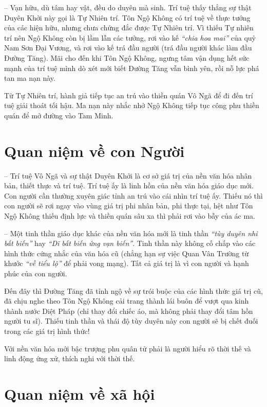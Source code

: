 -- Vạn hữu, dù tâm hay vật, đều do duyên mà sinh. Trí tuệ thấy thẳng sự thật Duyên Khởi này gọi là Tự Nhiên trí. Tôn Ngộ Không có trí tuệ về thực tướng của các hiện hữu, nhưng chưa chứng đắc được Tự Nhiên trí. Vì thiếu Tự nhiên trí nên Ngộ Không còn bị lầm lẫn các tưởng, rơi vào kế \emph{``chia hoa mai''} của quỷ Nam Sơn Đại Vương, và rơi vào kế trá đầu người (trá đầu người khác làm đầu Đường Tăng). Mãi cho đến khi Tôn Ngộ Không, ngưng tâm vận dụng hết sức mạnh của trí tuệ mình dò xét mới biết Đường Tăng vẫn bình yên, rồi nỗ lực phá tan ma nạn này.

Từ Tự Nhiên trí, hành giả tiếp tục an trú vào thiền quán Vô Ngã để đi đến trí tuệ giải thoát tối hậu. Ma nạn này nhắc nhở Ngộ Không tiếp tục công phu thiền quán để mở đường vào Tam Minh.

\section{Quan niệm về con Người} %
\label{sec:84_85_con_nguoi}

-- Trí tuệ Vô Ngã và sự thật Duyên Khởi là cơ sở giá trị của nền văn hóa nhân bản, thiết thực và trí tuệ. Trí tuệ ấy là linh hồn của nền văn hóa giáo dục mới. Con người cần thường xuyên giác tỉnh an trú vào cái nhìn trí tuệ ấy. Thiếu nó thì con người sẽ rơi ngay vào vùng giá trị phi nhân bản, phi thực tại, hệt như Tôn Ngộ Không thiếu định lực và thiền quán sâu xa thì phải rơi vào bẫy của ác ma.

-- Một tinh thần giáo dục khác của nền văn hóa mới là tinh thần \emph{``tùy duyên nhi bất biến''} hay \emph{``Dĩ bất biến ứng vạn biến''}. Tinh thần này không cố chấp vào các hình thức cứng nhắc của văn hóa cũ (chẳng hạn sự việc Quan Vân Trường từ khước \emph{``về tiểu lộ''} để phải vong mạng). Tất cả giá trị là vì con người và hạnh phúc của con người.

Đến đây thì Đường Tăng đã tỉnh ngộ về sự trói buộc của các hình thức giá trị cũ, đã chịu nghe theo Tôn Ngộ Không cải trang thành lái buôn để vượt qua kinh thành nước Diệt Pháp (chỉ thay đổi chiếc áo, mà không phải thay đổi tâm hồn người tu sĩ). Thiếu tinh thần và thái độ tùy duyên này con người sẽ bị chết đuối trong các giá trị hình thức!

Với nền văn hóa mới bậc trượng phu quân tử phải là người hiểu rõ thời thế và linh động ứng xử, thích nghi với thời thế.

\section{Quan niệm về xã hội} %
\label{sec:84_85_xa_hoi}

